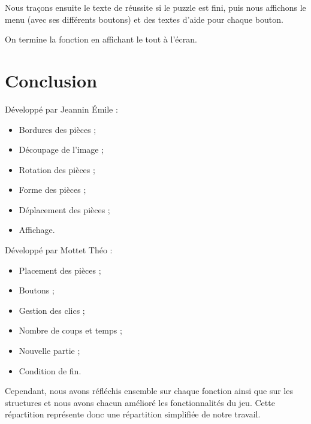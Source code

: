 \documentclass[]{article}
\begin{document}
Nous traçons ensuite le texte de réussite si le puzzle est fini, puis nous affichons le menu (avec ses différents boutons) et des textes d'aide pour chaque bouton.

On termine la fonction en affichant le tout à l'écran. 


\newpage

\section{Conclusion}

\begin{multicols}{2}

Développé par Jeannin Émile :
\begin{itemize}
\item
	Bordures des pièces ;
\item
	Découpage de l'image ;
\item
	Rotation des pièces ;
\item
	Forme des pièces ;
\item
	Déplacement des pièces ;
\item
	Affichage.
\end{itemize}

Développé par Mottet Théo :
\begin{itemize}
\item
	Placement des pièces ;
\item
	Boutons ;
\item
	Gestion des clics ;
\item
	Nombre de coups et temps ;
\item
	Nouvelle partie ;
\item
	Condition de fin.
\end{itemize}
\end{multicols}

Cependant, nous avons réfléchis ensemble sur chaque fonction ainsi que sur les structures et nous avons chacun amélioré les fonctionnalités du jeu. Cette répartition représente donc une répartition simplifiée de notre travail.

\listoffigures
\end{document}
